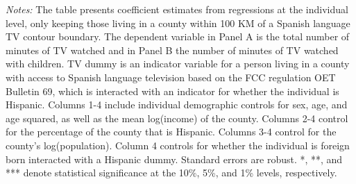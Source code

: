 \begin{table}[!htbp]
{\begin{threeparttable}
\begin{tablenotes}[flushleft]
				\item \textit{Notes:} The table presents coefficient estimates from regressions at the individual level, only keeping those living in a county within 100 KM of a Spanish language TV contour boundary. The dependent variable in Panel A is the total number of minutes of TV watched and in Panel B the number of minutes of TV watched with children. TV dummy is an indicator variable for a person living in a county with access to Spanish language television based on the FCC regulation OET Bulletin 69, which is interacted with an indicator for whether the individual is Hispanic. Columns 1-4 include individual demographic controls for sex, age, and age squared, as well as the mean log(income) of the county. Columns 2-4 control for the percentage of the county that is Hispanic. Columns 3-4 control for the county's log(population). Column 4 controls for whether the individual is foreign born interacted with a Hispanic dummy. Standard errors are robust. *, **, and *** denote statistical significance at the 10\%, 5\%, and 1\% levels, respectively.
			\end{tablenotes}
		\end{threeparttable}
	}
\end{table}